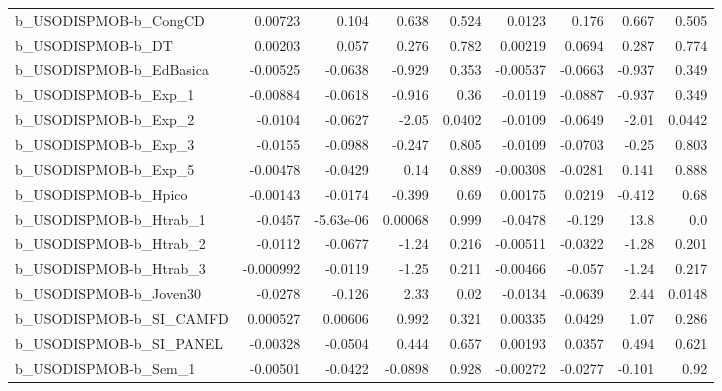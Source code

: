 \begin{tabular}{lrrrrrrrr}
b\_USODISPMOB-b\_CongCD      &     0.00723 &        0.104 &     0.638 &    0.524 &     0.0123 &       0.176 &        0.667 &         0.505 \\
b\_USODISPMOB-b\_DT          &     0.00203 &        0.057 &     0.276 &    0.782 &    0.00219 &      0.0694 &        0.287 &         0.774 \\
b\_USODISPMOB-b\_EdBasica    &    -0.00525 &      -0.0638 &    -0.929 &    0.353 &   -0.00537 &     -0.0663 &       -0.937 &         0.349 \\
b\_USODISPMOB-b\_Exp\_1       &    -0.00884 &      -0.0618 &    -0.916 &     0.36 &    -0.0119 &     -0.0887 &       -0.937 &         0.349 \\
b\_USODISPMOB-b\_Exp\_2       &     -0.0104 &      -0.0627 &     -2.05 &   0.0402 &    -0.0109 &     -0.0649 &        -2.01 &        0.0442 \\
b\_USODISPMOB-b\_Exp\_3       &     -0.0155 &      -0.0988 &    -0.247 &    0.805 &    -0.0109 &     -0.0703 &        -0.25 &         0.803 \\
b\_USODISPMOB-b\_Exp\_5       &    -0.00478 &      -0.0429 &      0.14 &    0.889 &   -0.00308 &     -0.0281 &        0.141 &         0.888 \\
b\_USODISPMOB-b\_Hpico       &    -0.00143 &      -0.0174 &    -0.399 &     0.69 &    0.00175 &      0.0219 &       -0.412 &          0.68 \\
b\_USODISPMOB-b\_Htrab\_1     &     -0.0457 &    -5.63e-06 &   0.00068 &    0.999 &    -0.0478 &      -0.129 &         13.8 &           0.0 \\
b\_USODISPMOB-b\_Htrab\_2     &     -0.0112 &      -0.0677 &     -1.24 &    0.216 &   -0.00511 &     -0.0322 &        -1.28 &         0.201 \\
b\_USODISPMOB-b\_Htrab\_3     &   -0.000992 &      -0.0119 &     -1.25 &    0.211 &   -0.00466 &      -0.057 &        -1.24 &         0.217 \\
b\_USODISPMOB-b\_Joven30     &     -0.0278 &       -0.126 &      2.33 &     0.02 &    -0.0134 &     -0.0639 &         2.44 &        0.0148 \\
b\_USODISPMOB-b\_SI\_CAMFD    &    0.000527 &      0.00606 &     0.992 &    0.321 &    0.00335 &      0.0429 &         1.07 &         0.286 \\
b\_USODISPMOB-b\_SI\_PANEL    &    -0.00328 &      -0.0504 &     0.444 &    0.657 &    0.00193 &      0.0357 &        0.494 &         0.621 \\
b\_USODISPMOB-b\_Sem\_1       &    -0.00501 &      -0.0422 &   -0.0898 &    0.928 &   -0.00272 &     -0.0277 &       -0.101 &          0.92 \\

\end{tabular}
